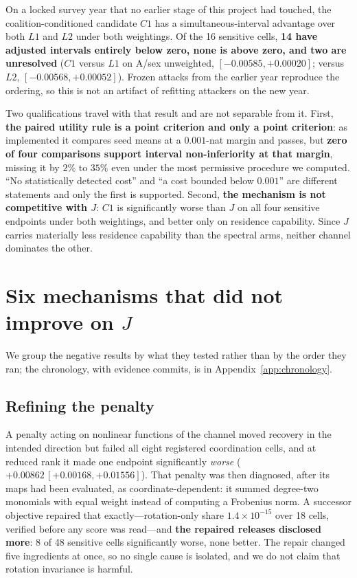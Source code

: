 \documentclass[conference]{IEEEtran}
\begin{document}
On a locked survey year that no earlier stage of this project had touched, the coalition-conditioned
candidate $C1$ has a simultaneous-interval advantage over both $L1$ and $L2$ under both weightings. Of
the 16 sensitive cells, \textbf{14 have adjusted intervals entirely below zero, none is above zero, and
two are unresolved} ($C1$ versus $L1$ on A/sex unweighted, $[-0.00585,+0.00020]$; versus $L2$,
$[-0.00568,+0.00052]$). Frozen attacks from the earlier year reproduce the ordering, so this is not an
artifact of refitting attackers on the new year.

Two qualifications travel with that result and are not separable from it. First, \textbf{the paired
utility rule is a point criterion and only a point criterion}: as implemented it compares seed means at a
$0.001$-nat margin and passes, but \textbf{zero of four comparisons support interval non-inferiority at
that margin}, missing it by $2\%$ to $35\%$ even under the most permissive procedure we computed. ``No
statistically detected cost'' and ``a cost bounded below $0.001$'' are different statements and only the
first is supported. Second, \textbf{the mechanism is not competitive with $J$}: $C1$ is significantly
worse than $J$ on all four sensitive endpoints under both weightings, and better only on residence
capability. Since $J$ carries materially less residence capability than the spectral arms, neither
channel dominates the other.

\section{Six mechanisms that did not improve on \texorpdfstring{$J$}{J}}
\label{sec:negative}

We group the negative results by what they tested rather than by the order they ran; the chronology, with
evidence commits, is in Appendix~\ref{app:chronology}.

\subsection{Refining the penalty}
A penalty acting on nonlinear functions of the channel moved recovery in the intended direction but
failed all eight registered coordination cells, and at reduced rank it made one endpoint significantly
\emph{worse} ($+0.00862\,[+0.00168,+0.01556]$). That penalty was then diagnosed, after its maps had been
evaluated, as coordinate-dependent: it summed degree-two monomials with equal weight instead of computing
a Frobenius norm. A successor objective repaired that exactly---rotation-only share $1.4\times10^{-15}$
over 18 cells, verified before any score was read---and \textbf{the repaired releases disclosed more}: 8
of 48 sensitive cells significantly worse, none better. The repair changed five ingredients at once, so
no single cause is isolated, and we do not claim that rotation invariance is harmful.
\end{document}
